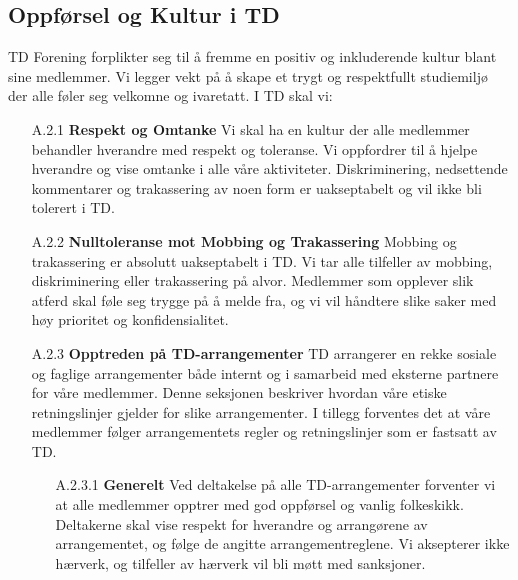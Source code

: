 \documentclass[11pt]{article}
\begin{document}
\subsection{Oppførsel og Kultur i TD}
TD Forening forplikter seg til å fremme en positiv og inkluderende kultur blant sine medlemmer. Vi legger vekt på å skape et trygt og respektfullt studiemiljø der alle føler seg velkomne og ivaretatt. I TD skal vi:
 \begin{itemize}
     \item[A.2.1] \textbf{Respekt og Omtanke}
     \newline
     Vi skal ha en kultur der alle medlemmer behandler hverandre med respekt og toleranse. Vi oppfordrer til å hjelpe hverandre og vise omtanke i alle våre aktiviteter. Diskriminering, nedsettende kommentarer og trakassering av noen form er uakseptabelt og vil ikke bli tolerert i TD.

     \item[A.2.2] \textbf{Nulltoleranse mot Mobbing og Trakassering}
     \newline
     Mobbing og trakassering er absolutt uakseptabelt i TD. Vi tar alle tilfeller av mobbing, diskriminering eller trakassering på alvor. Medlemmer som opplever slik atferd skal føle seg trygge på å melde fra, og vi vil håndtere slike saker med høy prioritet og konfidensialitet.

     \item[A.2.3] \textbf{Opptreden på TD-arrangementer}
     \newline
     TD arrangerer en rekke sosiale og faglige arrangementer både internt og i samarbeid med eksterne partnere for våre medlemmer. Denne seksjonen beskriver hvordan våre etiske retningslinjer gjelder for slike arrangementer. I tillegg forventes det at våre medlemmer følger arrangementets regler og retningslinjer som er fastsatt av TD.
     \begin{enumerate}
         \item[A.2.3.1] \textbf{Generelt}
         \newline
         Ved deltakelse på alle TD-arrangementer forventer vi at alle medlemmer opptrer med god oppførsel og vanlig folkeskikk. Deltakerne skal vise respekt for hverandre og arrangørene av arrangementet, og følge de angitte arrangementreglene. Vi aksepterer ikke hærverk, og tilfeller av hærverk vil bli møtt med sanksjoner.


\end{enumerate}
\end{itemize}
\end{document}
